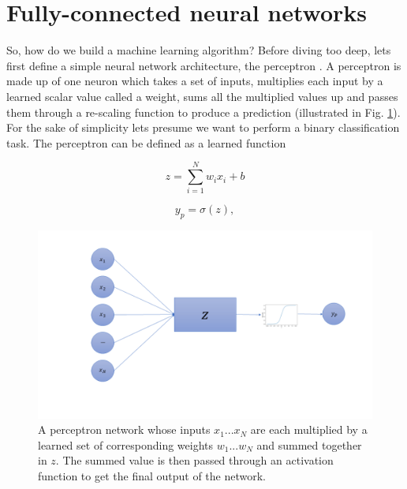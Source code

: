 \section{Fully-connected neural networks}

%
%
So, how do we build a machine learning algorithm? Before diving too deep, lets first define a simple neural network architecture, the perceptron \cite{minsky69perceptrons}. A perceptron is made up of one neuron which takes a set of inputs, multiplies each input by a learned scalar value called a weight, sums all the multiplied values up and passes them through a re-scaling function to produce a prediction (illustrated in Fig. \ref{fig:Perceptron_network}). For the sake of simplicity lets presume we want to perform a binary classification task. The perceptron can be defined as a learned function

\begin{equation}
    z = \sum_{i=1}^{N} w_{i} x_{i} + b
\end{equation}{}

\begin{equation}
    y_{p} = \sigma(z),
\end{equation}{}

\begin{figure}
    \centering
    \includegraphics[width=\linewidth]{figures/Perceptron_network.png}
    \caption[Perceptron network illustration]{A perceptron network whose inputs $x_1 ... x_N$ are each multiplied 
    by a learned set of corresponding weights $w_1 ... w_N$ and summed together in $z$. 
    The summed value is then passed through an activation function to get the final 
    output of the network.}
    \label{fig:Perceptron_network}
\end{figure}

